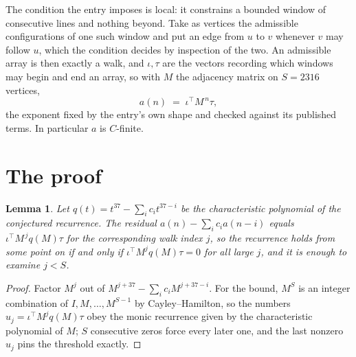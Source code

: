 \documentclass[11pt,a4paper]{article}
\theoremstyle{plain}
\newtheorem{lemma}[theorem]{Lemma}
\theoremstyle{definition}
\begin{document}
The condition the entry imposes is local: it constrains a bounded window of consecutive lines and nothing beyond. Take as vertices the admissible configurations of one such window and put an edge from $u$ to $v$ whenever $v$ may follow $u$, which the condition decides by inspection of the two.
An admissible array is then exactly a walk, and $\iota,\tau$ are the vectors recording which windows may begin and end an array, so with $M$ the adjacency matrix on $S=2316$ vertices,
\[
a(n)\;=\;\iota^{\!\top}M^{\,n}\tau ,
\]
the exponent fixed by the entry's own shape and checked against its published terms. In
particular $a$ is $C$-finite.

\section{The proof}

\begin{lemma}\label{lem:crit}
Let $q(t)=t^{37}-\sum_i c_it^{37-i}$ be the characteristic polynomial of the
conjectured recurrence. The residual $a(n)-\sum_ic_ia(n-i)$ equals
$\iota^{\!\top}M^{\,j}q(M)\tau$ for the corresponding walk index $j$, so the recurrence
holds from some point on if and only if $\iota^{\!\top}M^{j}q(M)\tau=0$ for all large $j$,
and it is enough to examine $j<S$.
\end{lemma}

\begin{proof}
Factor $M^{j}$ out of $M^{j+37}-\sum_ic_iM^{j+37-i}$. For the bound, $M^{S}$
is an integer combination of $I,M,\dots,M^{S-1}$ by Cayley--Hamilton, so the numbers
$u_j=\iota^{\!\top}M^{j}q(M)\tau$ obey the monic recurrence given by the characteristic
polynomial of $M$; $S$ consecutive zeros force every later one, and the last nonzero $u_j$
pins the threshold exactly.
\end{proof}
\end{document}
